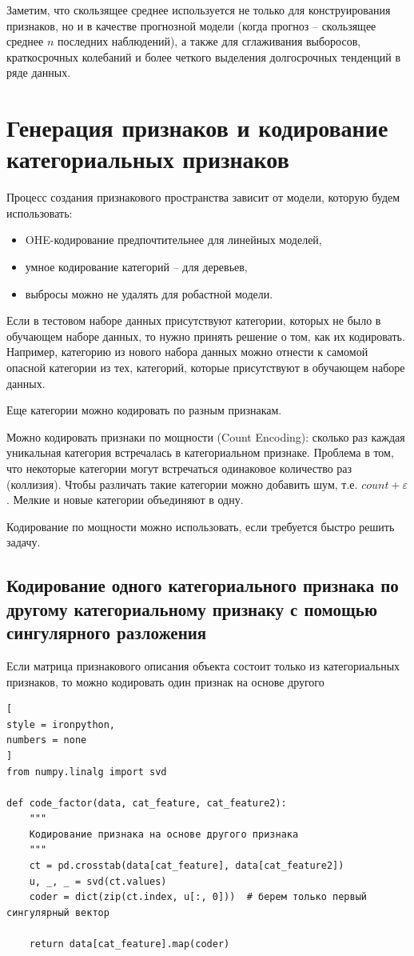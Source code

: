 \documentclass[%
	11pt,
	a4paper,
	utf8,
		]{article}
\begin{document}
Заметим, что скользящее среднее используется не только для конструирования признаков, но и в качестве прогнозной модели (когда прогноз -- скользящее среднее $ n $ последних наблюдений), а также для сглаживания выборосов, краткосрочных колебаний и более четкого выделения долгосрочных тенденций в ряде данных.

\section{Генерация признаков и кодирование категориальных признаков}

Процесс создания признакового пространства зависит от модели, которую будем использовать:
\begin{itemize}
	\item OHE-кодирование предпочтительнее для линейных моделей,
	
	\item умное кодирование категорий -- для деревьев,
	
	\item выбросы можно не удалять для робастной модели.
\end{itemize}

Если в тестовом наборе данных присутствуют категории, которых не было в обучающем наборе данных, то нужно принять решение о том, как их кодировать. Например, категорию из нового набора данных можно отнести к самомой опасной категории из тех, категорий, которые присутствуют в обучающем наборе данных.

Еще категории можно кодировать по разным признакам.

Можно кодировать признаки по мощности (Count Encoding): сколько раз каждая уникальная категория встречалась в категориальном признаке. Проблема в том, что некоторые категории могут встречаться одинаковое количество раз (коллизия). Чтобы различать такие категории можно добавить шум, т.е. $ count + \varepsilon $. Мелкие и новые категории объединяют в одну.

Кодирование по мощности можно использовать, если требуется быстро решить задачу.

\subsection{Кодирование одного категориального признака по другому категориальному признаку с помощью сингулярного разложения}

Если матрица признакового описания объекта состоит только из категориальных признаков, то можно кодировать один признак на основе другого
\begin{lstlisting}[
style = ironpython,
numbers = none
]
from numpy.linalg import svd

def code_factor(data, cat_feature, cat_feature2):
    """
    Кодирование признака на основе другого признака
    """
    ct = pd.crosstab(data[cat_feature], data[cat_feature2])
    u, _, _ = svd(ct.values)
    coder = dict(zip(ct.index, u[:, 0]))  # берем только первый сингулярный вектор
    
    return data[cat_feature].map(coder)
\end{lstlisting}
\end{document}
